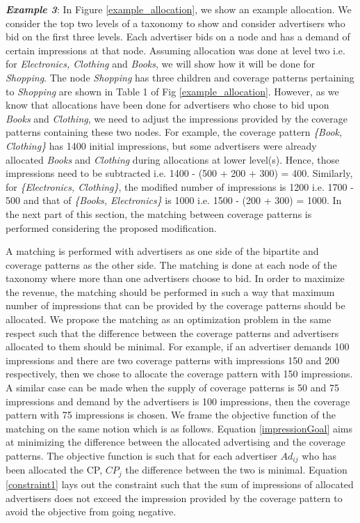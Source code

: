 \textit{\textbf{Example 3}}: In Figure \ref{example_allocation}, we show an example allocation. We consider the top two levels of a taxonomy to show and consider advertisers who bid on the first three levels. Each advertiser bids on a node and has a demand of certain impressions at that node. Assuming allocation was done at level two i.e. for \textit{Electronics, Clothing} and \textit{Books}, we will show how it will be done for \textit{Shopping}. The node \textit{Shopping} has three children and coverage patterns pertaining to \textit{Shopping} are shown in Table 1 of Fig \ref{example_allocation}. However, as we know that allocations have been done for advertisers who chose to bid upon \textit{Books} and \textit{Clothing}, we need to adjust the impressions provided by the coverage patterns containing these two nodes. For example, the coverage pattern \textit{\{Book, Clothing\}} has 1400 initial impressions, but some advertisers were already allocated \textit{Books} and \textit{Clothing} during allocations at lower level(s). Hence, those impressions need to be subtracted i.e. 1400 - (500 + 200 + 300) = 400. Similarly, for \textit{\{Electronics, Clothing\}}, the modified number of impressions is 1200 i.e. 1700 - 500 and that of \textit{\{Books, Electronics\}} is 1000 i.e. 1500 - (200 + 300) = 1000. In the next part of this section, the matching between coverage patterns is performed considering the proposed modification.
\par
A matching is performed with advertisers as one side of the bipartite and coverage patterns as the other side. The matching is done at each node of the taxonomy where more than one advertisers choose to bid.
In order to maximize the revenue, the matching should be performed in such a way that maximum number of impressions that can be provided by the coverage patterns should be allocated. We propose the matching as an optimization problem in the same respect such that the difference between the coverage patterns and advertisers allocated to them should be minimal. For example, if an advertiser demands 100 impressions and there are two coverage patterns with impressions 150 and 200 respectively, then we chose to allocate the coverage pattern with 150 impressions. A similar case can be made when the supply of coverage patterns is 50 and 75 impressions and demand by the advertisers is 100 impressions, then the coverage pattern with 75 impressions is chosen. We frame the objective function of the matching on the same notion which is as follows. Equation \ref{impressionGoal} aims at minimizing the difference between the allocated advertising and the coverage patterns. The objective function is such that for each advertiser $Ad_{ij}$ who has been allocated the CP, $CP_{j}$ the difference between the two is minimal. Equation \ref{constraint1} lays out the constraint such that the sum of impressions of allocated advertisers does not exceed the impression provided by the coverage pattern to avoid the objective from going negative.

